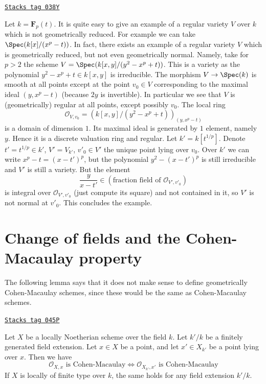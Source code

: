 \begin{example}
\label{varieties-example-geometrically-reduced-not-normal}
\href{https://stacks.math.columbia.edu/tag/038Y}{\texttt{Stacks tag 038Y}}

Let $k =\mathbf{F}_p(t)$. It is quite easy to give an example of a regular
variety $V$ over $k$ which is not geometrically reduced. For example we
can take $\Spec(k[x]/(x^p - t))$. In fact, there exists an
example of a regular variety $V$ which is geometrically reduced, but
not even geometrically normal. Namely, take for $p > 2$ the scheme
$V = \Spec(k[x, y]/(y^2 - x^p + t))$. This is a variety as the
polynomial $y^2 - x^p + t \in k[x, y]$ is irreducible.
The morphism $V \to \Spec(k)$ is smooth at all points
except at the point $v_0 \in V$ corresponding to the maximal ideal
$(y, x^p - t)$ (because $2y$ is invertible). In particular we see that
$V$ is (geometrically) regular at all points, except possibly $v_0$.
The local ring
$$
\mathcal{O}_{V, v_0} = \left(k[x, y]/(y^2 - x^p + t)\right)_{(y, x^p - t)}
$$
is a domain of dimension $1$. Its maximal ideal is generated by $1$ element,
namely $y$. Hence it is a discrete valuation ring and regular.
Let $k' = k[t^{1/p}]$. Denote $t' = t^{1/p} \in k'$,
$V' = V_{k'}$, $v'_0 \in V'$ the unique point lying over $v_0$.
Over $k'$ we can write $x^p - t = (x - t')^p$, but the polynomial
$y^2 - (x - t')^p$ is still irreducible and $V'$ is still a variety.
But the element
$$
\frac{y}{x - t'} \in (\text{fraction field of }\mathcal{O}_{V', v'_0})
$$
is integral over $\mathcal{O}_{V', v'_0}$ (just compute its square)
and not contained in it, so $V'$ is not normal at $v'_0$. This concludes
the example.
\end{example}

\section{Change of fields and the Cohen-Macaulay property}
\label{varieties-section-CM}
The following lemma says that it does not make sense to define
geometrically Cohen-Macaulay schemes, since these would be the
same as Cohen-Macaulay schemes.

\begin{lemma}
\label{varieties-lemma-CM-base-change}
\href{https://stacks.math.columbia.edu/tag/045P}{\texttt{Stacks tag 045P}}

Let $X$ be a locally Noetherian scheme over the field $k$.
Let $k'/k$ be a finitely generated field extension.
Let $x \in X$ be a point, and let $x' \in X_{k'}$ be a point lying
over $x$. Then we have
$$
\mathcal{O}_{X, x}\text{ is Cohen-Macaulay}
\Leftrightarrow
\mathcal{O}_{X_{k'}, x'}\text{ is Cohen-Macaulay}
$$
If $X$ is locally of finite type over $k$, the same holds for any
field extension $k'/k$.
\end{lemma}

